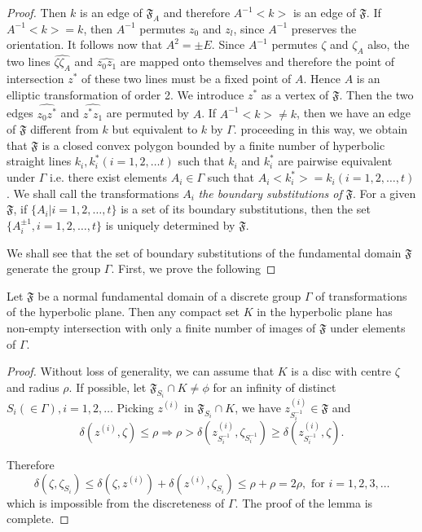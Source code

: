 \begin{proof}
Then $k$ is an edge of $\mathfrak{F}_A$ and therefore $A^{-1}<k>$ is
an edge of $\mathfrak{F}$. If $A^{-1}<k>=k$, then $A^{-1}$ permutes
$z_0$ and \pageoriginale $z_l$, since $A^{-1}$ preserves the
orientation. It follows now that $A^2=\pm E$. Since $A^{-1}$ permutes
$\zeta$ and $\zeta_A$ also, the two lines $\widehat{\zeta\zeta_A}$ and
$\widehat{z_0z_1}$ are mapped onto themselves and therefore the point
of intersection $z^{\ast}$ of these two lines must be a fixed point of
$A$. Hence $A$ is an elliptic transformation of order 2. We introduce
$z^{\ast}$ as a vertex of $\mathfrak{F}$. Then the two edges
$\widehat{z_0z^{\ast}}$ and $\widehat{z^{\ast}z_1}$ are permuted by
$A$. If $A^{-1}<k> \neq k$, then we have an edge of $\mathfrak{F}$
different from $k$ but equivalent to $k$ by $\Gamma$. proceeding in
this way, we obtain that $\mathfrak{F}$ is a closed convex polygon
bounded by a finite number of hyperbolic straight lines $k_i,
k^{\ast}_i (i=1,2,\ldots t)$ such that $k_i$ and $k^{\ast}_i$ are
pairwise equivalent under $\Gamma$ i.e. there exist elements $A_i
\in \Gamma$ such that $A_i <k^{\ast}_i>= k_i(i=1,2,\ldots ,
t)$. We shall call the transformations $A_i$ \textit{the boundary
  substitutions of } $\mathfrak{F}$. For a given $\mathfrak{F}$, if
$\{A_i | i = 1, 2, \ldots, t\}$ is a set of its boundary
substitutions, then the set $\{A^{\pm 1}_i, i = 1, 2, \ldots, t\}$ is
uniquely determined by $\mathfrak{F}$.

We shall see that the set of boundary substitutions of the fundamental
domain $\mathfrak{F}$ generate the group $\Gamma$. First, we prove the
following 
\end{proof}

\begin{lem}\label{chap1:lem2}
Let $\mathfrak{F}$ be a normal fundamental domain of a discrete group
$\Gamma$ of transformations of the hyperbolic plane. Then any compact
set $K$ in the hyperbolic plane has non-empty intersection with only a
finite number of images of $\mathfrak{F}$ under elements of $\Gamma$.
\end{lem}

\begin{proof}
Without loss of generality, we can assume that $K$ is a disc with
centre $\zeta$ and radius $\rho$. If possible, let $\mathfrak{F}_{S_i}
\cap K \neq \phi$ for an infinity of distinct $S_i (\in
\Gamma), i=1,2,\ldots$ Picking $z^{(i)}$ in $\mathfrak{F}_{S_i} \cap
K$, we have $z^{(i)}_{S^{-1}_i}\in \mathfrak{F}$ and 
$$
\delta(z^{(i)},\zeta) \leq \rho \Longrightarrow \rho >
\delta\left(z^{(i)}_{S^{-1}_i}, \zeta_{S^{-1}_i}  \right) \geq \delta
\left(z^{(i)}_{S^{-1}_i },\zeta\right).
$$\pageoriginale

Therefore
$$
\delta (\zeta,\zeta_{S_i}) \leq \delta (\zeta,z^{(i)}) + \delta
(z^{(i)}, \zeta_{S_i}) \leq \rho + \rho = 2\rho,
\text{ for } i = 1,2,3, \ldots 
$$
which is impossible from the discreteness of $\Gamma$. The proof of
the lemma is complete. 
\end{proof}

